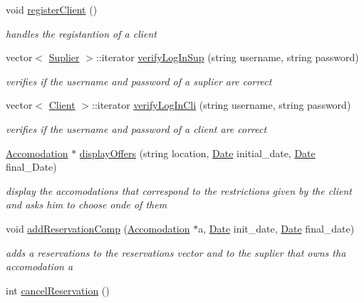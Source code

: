 \begin{DoxyCompactItemize}
\hypertarget{class_company_a402904c6651146a9ca6023e72bd6c8fc}{}\label{class_company_a402904c6651146a9ca6023e72bd6c8fc} 
void \hyperlink{class_company_a402904c6651146a9ca6023e72bd6c8fc}{register\+Client} ()
\begin{DoxyCompactList}\small\item\em handles the registantion of a client \end{DoxyCompactList}\item 
vector$<$ \hyperlink{class_suplier}{Suplier} $>$\+::iterator \hyperlink{class_company_a9012e0fa84141868a482a0a69b6313af}{verify\+Log\+In\+Sup} (string username, string password)
\begin{DoxyCompactList}\small\item\em verifies if the username and password of a suplier are correct \end{DoxyCompactList}\item 
vector$<$ \hyperlink{class_client}{Client} $>$\+::iterator \hyperlink{class_company_ae09dab4c6a0d26207cdeffd0d5adcf8f}{verify\+Log\+In\+Cli} (string username, string password)
\begin{DoxyCompactList}\small\item\em verifies if the username and password of a client are correct \end{DoxyCompactList}\item 
\hyperlink{class_accomodation}{Accomodation} $\ast$ \hyperlink{class_company_a2b6d438df8e871898eef5fc5e3e8f761}{display\+Offers} (string location, \hyperlink{class_date}{Date} initial\+\_\+date, \hyperlink{class_date}{Date} final\+\_\+\+Date)
\begin{DoxyCompactList}\small\item\em display the accomodations that correspond to the restrictions given by the client and asks him to choose onde of them \end{DoxyCompactList}\item 
void \hyperlink{class_company_aafc4b607edcf5a01500c42c03d1322ad}{add\+Reservation\+Comp} (\hyperlink{class_accomodation}{Accomodation} $\ast$a, \hyperlink{class_date}{Date} init\+\_\+date, \hyperlink{class_date}{Date} final\+\_\+date)
\begin{DoxyCompactList}\small\item\em adds a reservations to the reservations vector and to the suplier that owns tha accomodation a \end{DoxyCompactList}\item 
int \hyperlink{class_company_ab3dbac165de998e1e711a6dba7cbbf51}{cancel\+Reservation} ()

\end{DoxyCompactItemize}
